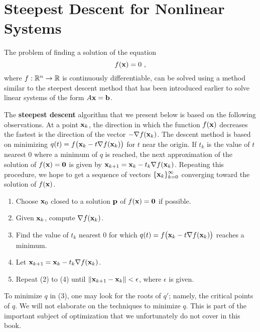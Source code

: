 \section{Steepest Descent for Nonlinear Systems}

The problem of finding a solution of the equation
\begin{equation}
f(\mathbf{x})  = 0 \ ,
\end{equation}
where $f:\mathbb{R}^n \rightarrow \mathbb{R}$ is continuously differentiable, can 
be solved using a method similar to the steepest descent method that
has been introduced earlier to solve linear systems of the form
$A\mathbf{x}=\mathbf{b}$.

The {\bfseries steepest descent} algorithm
that we present below is based on the following observations.  At a
point $\mathbf{x}_k$, the direction in which the function $f(\mathbf{x})$
decreases the fastest is the direction of the vector $-\nabla
f(\mathbf{x}_k)$.  The descent method is based on minimizing
$\displaystyle q(t) = f\big(\mathbf{x}_k - t \nabla f(\mathbf{x}_k)\big)$
for $t$ near the origin.  If $t_k$ is the value of $t$ nearest $0$ where a
minimum of $q$ is reached, the next approximation of the solution of
$f(\mathbf{x})=\mathbf{0}$ is given by
$\displaystyle \mathbf{x}_{k+1} = \mathbf{x}_k - t_k \nabla f(\mathbf{x}_k)$.
Repeating this procedure, we hope to get a sequence of vectors
$\displaystyle \{\mathbf{x}_k\}_{k=0}^\infty$ converging toward the
solution of $f(\mathbf{x})$.

\begin{algo}
\begin{enumerate}
\item Choose $\mathbf{x}_0$ closed to a solution $\mathbf{p}$ of
$f(\mathbf{x}) = \mathbf{0}$ if possible.
\item Given $\mathbf{x}_k$, compute
$\displaystyle \nabla f(\mathbf{x}_k)$.
\item Find the value of $t_k$ nearest $0$ for which
$\displaystyle q(t) = f\big(\mathbf{x}_k - t \nabla f(\mathbf{x}_k)\big)$
reaches a minimum.
\item Let
$\displaystyle \mathbf{x}_{k+1} = \mathbf{x}_k - t_k \nabla f(\mathbf{x}_k)$.
\item  Repeat (2) to (4) until
$\| \mathbf{x}_{k+1} - \mathbf{x}_k \| < \epsilon$,
where $\epsilon$ is given.
\end{enumerate}
\end{algo}

To minimize $q$ in (3), one may look for the roots of $q'$;
namely, the critical points of $q$.  We will not elaborate on the
techniques to minimize $q$.  This is part of the important subject of
optimization that we unfortunately do not cover in this book.

